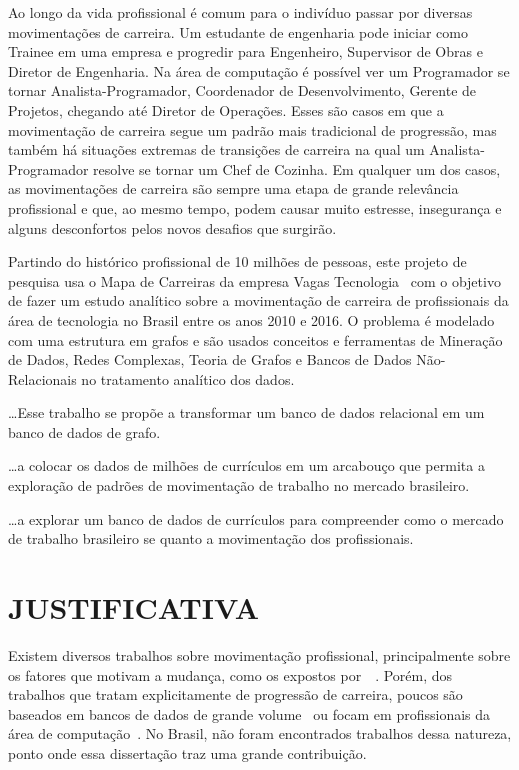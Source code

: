 \documentclass[12pt,a4paper]{article}
\begin{document}
Ao longo da vida profissional é comum para o indivíduo passar por diversas movimentações de carreira. Um estudante de engenharia pode iniciar como Trainee em uma empresa e progredir para Engenheiro, Supervisor de Obras e Diretor de Engenharia. Na área de computação é possível ver um Programador se tornar Analista-Programador, Coordenador de Desenvolvimento, Gerente de Projetos, chegando até Diretor de Operações. Esses são casos em que a movimentação de carreira segue um padrão mais tradicional de progressão, mas também há situações extremas de transições de carreira na qual um Analista-Programador resolve se tornar um Chef de Cozinha. Em qualquer um dos casos, as movimentações de carreira são sempre uma etapa de grande relevância profissional e que, ao mesmo tempo, podem causar muito estresse, insegurança e alguns desconfortos pelos novos desafios que surgirão.

Partindo do histórico profissional de 10 milhões de pessoas, este projeto de pesquisa usa o Mapa de Carreiras da empresa Vagas Tecnologia~ com o objetivo de fazer um estudo analítico sobre a movimentação de carreira de profissionais da área de tecnologia no Brasil entre os anos 2010 e 2016. O problema é modelado com uma estrutura em grafos e são usados conceitos e ferramentas de Mineração de Dados, Redes Complexas, Teoria de Grafos e Bancos de Dados Não-Relacionais no tratamento analítico dos dados.


\ldots Esse trabalho se propõe a transformar um banco de dados relacional em um banco de dados de grafo.

\ldots a colocar os dados de milhões de currículos em um arcabouço que permita a exploração de padrões de movimentação de trabalho no mercado brasileiro.

\ldots a explorar um banco de dados de currículos para compreender como o mercado de trabalho brasileiro se quanto a movimentação dos profissionais.

\section{JUSTIFICATIVA}

Existem diversos trabalhos sobre movimentação profissional, principalmente sobre os fatores que motivam a mudança, como os expostos por~~. Porém, dos trabalhos que tratam explicitamente de progressão de carreira, poucos são baseados em bancos de dados de grande volume~\cite{Cetintas2011-op,Xu2014-gj,Xu2015-jb} ou focam em profissionais da área de computação~\cite{Qu2016-dy}. No Brasil, não foram encontrados trabalhos dessa natureza, ponto onde essa dissertação traz uma grande contribuição.
\end{document}
